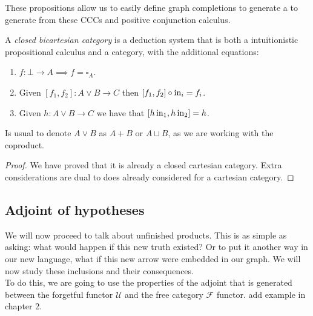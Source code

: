 These propositions allow us to easily define graph completions to generate a to generate from these CCCs and positive conjunction calculus.

\begin{proposition} A \emph{closed bicartesian category} is a deduction system that is both a intuitionistic propositional calculus and a category, with the additional equations:
  \begin{enumerate}
  \item $f:\bot \to A \implies f=\square_A$.
  \item Given $[f_1,f_2] : A\lor B \to C$ then $ [f_1,f_2]\circ \operatorname{in}_i  = f_i$.
  \item Given $h:A\lor B\to C$ we have that $[ h\operatorname{in}_1, h\operatorname{in}_2] = h$.
  \end{enumerate}
\end{proposition}
\begin{remark}
  Is usual to denote $A\lor B$ as $A+B$ or $A\sqcup B$, as we are working with the coproduct.
\end{remark} 
\begin{proof}
  We have proved that it is already a closed cartesian category. Extra considerations are dual to does already considered for a cartesian category.
\end{proof}
\subsection{Adjoint of hypotheses}

We will now proceed to talk about unfinished products. This is as simple as asking: what would happen if this new truth existed? Or to put it another way in our new language, what if this new arrow were embedded in our graph. We will now study these inclusions and their consequences.\\

To do this, we are going to use the properties of the adjoint that is generated between the forgetful functor $\mathcal U$ and the free category $\mathcal{F}$ functor.{\color {red} add example in chapter 2}.\\



